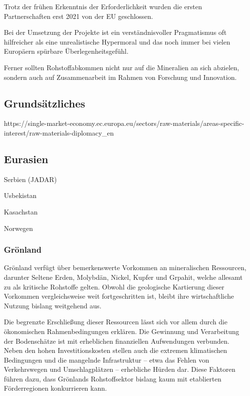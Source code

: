 \documentclass[12pt,a4paper,oneside]{book} %
\begin{document}
Trotz der frühen Erkenntnis der Erforderlichkeit wurden die ersten Partnerschaften erst 2021 von der EU geschlossen.

\glqq Bei der Umsetzung der Projekte ist ein verständnisvoller Pragmatismus oft hilfreicher als eine unrealistische Hypermoral und das noch immer bei vielen Europäern spürbare Überlegenheitsgefühl.\grqq \autocite{https://www.africa-business-guide.de/de/praxis/erfahrungen/schluesselrolle-afrikas-bedeutung-bei-den-kritischen-rohstoffen--1920084}

Ferner sollten Rohstoffabkommen nicht nur auf die Mineralien an sich abzielen, sondern auch auf Zusammenarbeit im Rahmen von Forschung und Innovation.\autocite{ÖAW}

\subsection{Grundsätzliches}

https://single-market-economy.ec.europa.eu/sectors/raw-materials/areas-specific-interest/raw-materials-diplomacy_en

\subsection{Eurasien}

Serbien (JADAR)

Usbekistan

Kasachstan

Norwegen

\subsubsection{Grönland}

Grönland verfügt über bemerkenswerte Vorkommen an mineralischen Ressourcen, darunter Seltene Erden, Molybdän, Nickel, Kupfer und Grpahit, welche allesamt zu als kritische Rohstoffe gelten. Obwohl die geologische Kartierung dieser Vorkommen vergleichsweise weit fortgeschritten ist, bleibt ihre wirtschaftliche Nutzung bislang weitgehend aus.

Die begrenzte Erschließung dieser Ressourcen lässt sich vor allem durch die ökonomischen Rahmenbedingungen erklären. Die Gewinnung und Verarbeitung der Bodenschätze ist mit erheblichen finanziellen Aufwendungen verbunden. Neben den hohen Investitionskosten stellen auch die extremen klimatischen Bedingungen und die mangelnde Infrastruktur – etwa das Fehlen von Verkehrswegen und Umschlagplätzen – erhebliche Hürden dar. Diese Faktoren führen dazu, dass Grönlands Rohstoffsektor bislang kaum mit etablierten Förderregionen konkurrieren kann.
\end{document}
